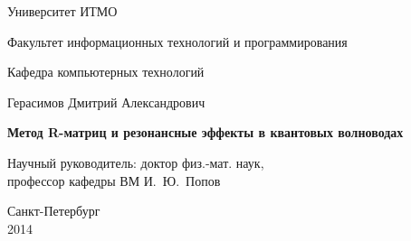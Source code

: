 \documentclass[a4paper]{report}
\theoremstyle{plain}
\theoremstyle{definition}
\numberwithin{theorem}{chapter}        %
\begin{document}
\initializefrontsections

\pagestyle{title}

\begin{center}
Университет ИТМО

\vspace{2cm}

Факультет информационных технологий и программирования

Кафедра компьютерных технологий

\vspace{3cm}

{\Large Герасимов Дмитрий Александрович}

\vspace{2cm}

\vbox{\LARGE\bfseries
Метод R-матриц и резонансные эффекты в квантовых волноводах
}

\vspace{4cm}

{\Large Научный руководитель: доктор физ.-мат. наук, \\ профессор кафедры ВМ И.~Ю.~Попов}

\vspace{6cm}

Санкт-Петербург\\ 2014
\end{center}

\newpage

\setcounter{page}{3}
\pagestyle{plain}

\tableofcontents

\startthechapters



% 



\printbibliography

%
\end{document}
